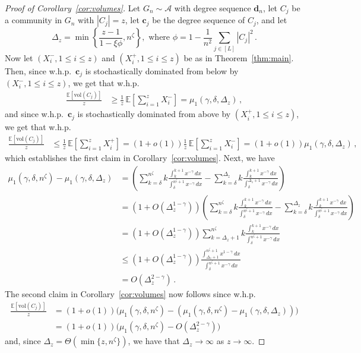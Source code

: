 \documentclass[12pt]{article}
\theoremstyle{definition}
\theoremstyle{remark}
\theoremstyle{remark}
\numberwithin{theorem}{section}
\newcommand{\E}[1]{{\mathbb E}\left[#1\right]}
\newcommand{\abcdDist}{\ensuremath{\mathcal{A}}}
\newcommand{\moment}[2]{\ensuremath{\mu_{#1}(#2)}}
\begin{document}
\begin{proof}[Proof of Corollary~\ref{cor:volumes}]
Let $G_n \sim \abcdDist$ with degree sequence $\mathbf{d}_n$, let $C_j$ be a community in $G_n$ with $|C_j| = z$, let $\mathbf{c}_j$ be the degree sequence of $C_j$, and let 
\[
\Delta_z = \min \left\{ \frac{z-1}{1-\xi \phi} , n^\zeta \right\}, \text{ where } \phi = 1 - \frac{1}{n^2} \sum_{j \in [L]} |C_j|^2 \,.
\]
Now let $(X_i^-, 1 \leq i \leq z)$ and $(X_i^+, 1 \leq i \leq z)$ be as in Theorem~\ref{thm:main}. Then, since w.h.p.\ $\mathbf{c}_j$ is stochastically dominated from below by $(X_i^-, 1 \leq i \leq z)$, we get that w.h.p.\
\begin{align*}
\frac{\E{\mathrm{vol}(C_j)}}{z} 
&\geq \frac{1}{z} \, \E{\sum_{i = 1}^z X_i^-}
= \moment{1}{\gamma,\delta,\Delta_z} \,,
\end{align*}
and since w.h.p.\ $\mathbf{c}_j$ is stochastically dominated from above by $(X_i^+, 1 \leq i \leq z)$, we get that w.h.p.\
\begin{align*}
\frac{\E{\mathrm{vol}(C_j)}}{z} 
&\leq \frac{1}{z} \, \E{\sum_{i = 1}^z X_i^+}
= (1+o(1)) \frac{1}{z} \, \E{\sum_{i = 1}^z X_i^-}
= (1+o(1)) \moment{1}{\gamma,\delta,\Delta_z} \,,
\end{align*}
which establishes the first claim in Corollary~\ref{cor:volumes}. Next, we have 
\begin{align*}
\moment{1}{\gamma,\delta,n^\zeta} - \moment{1}{\gamma,\delta,\Delta_z}
&=
\left( \sum_{k=\delta}^{n^\zeta} k \frac{\int_k^{k+1} x^{-\gamma} \, dx}{\int_\delta^{n^\zeta+1} x^{-\gamma} \, dx} - \sum_{k=\delta}^{\Delta_z} k \frac{\int_k^{k+1} x^{-\gamma} \, dx}{\int_\delta^{\Delta_z+1} x^{-\gamma} \, dx} \right)\\
&=
\left( 1+ O(\Delta_z^{1-\gamma}) \right) \left( \sum_{k=\delta}^{n^\zeta} k \frac{\int_k^{k+1} x^{-\gamma} \, dx}{\int_\delta^{n^\zeta+1} x^{-\gamma} \, dx} - \sum_{k=\delta}^{\Delta_z} k \frac{\int_k^{k+1} x^{-\gamma} \, dx}{\int_\delta^{n^\zeta+1} x^{-\gamma} \, dx} \right)\\
&=
\left( 1+ O(\Delta_z^{1-\gamma}) \right) \sum_{k=\Delta_z+1}^{n^\zeta} k \frac{\int_k^{k+1} x^{-\gamma} \, dx}{\int_\delta^{n^\zeta+1} x^{-\gamma} \, dx}\\
&\leq
\left( 1+ O(\Delta_z^{1-\gamma}) \right) \frac{\int_{\Delta_z+1}^{n^\zeta+1} x^{1-\gamma} \, dx}{\int_\delta^{n^\zeta+1} x^{-\gamma} \, dx}\\
&=
O(\Delta_z^{2-\gamma}) \,.
\end{align*}
The second claim in Corollary~\ref{cor:volumes} now follows since w.h.p.\
\begin{align*}
\frac{\E{\mathrm{vol}(C_j)}}{z} 
&= (1+o(1)) \Big( \moment{1}{\gamma,\delta,n^\zeta} - \left( \moment{1}{\gamma,\delta,n^\zeta} - \moment{1}{\gamma,\delta,\Delta_z} \right) \Big)\\
&= (1+o(1)) \Big( \moment{1}{\gamma,\delta,n^\zeta} - O(\Delta_z^{2-\gamma}) \Big) 
\end{align*}
and, since $\Delta_z = \Theta(\min\{z,n^{\zeta}\})$, we have that $\Delta_z \to \infty$ as $z \to \infty$. 
\end{proof}
\end{document}
